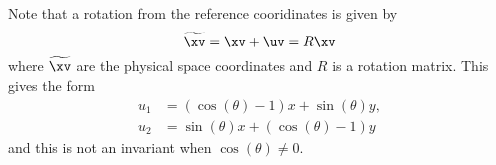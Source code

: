 Note that a rotation from the reference cooridinates is given by
\[
  \widetilde{\xv}=\xv +\uv = R \xv 
\]
where $\widetilde{\xv}$ are the physical space coordinates and $R$ is
a rotation matrix. This gives the form
\begin{align*}
   u_1 &= (\cos(\theta)-1)x + \sin(\theta) y,\\
   u_2 &= \sin(\theta) x + (\cos(\theta)-1) y
\end{align*}
and this is not an invariant when $\cos(\theta)\ne 0$.
